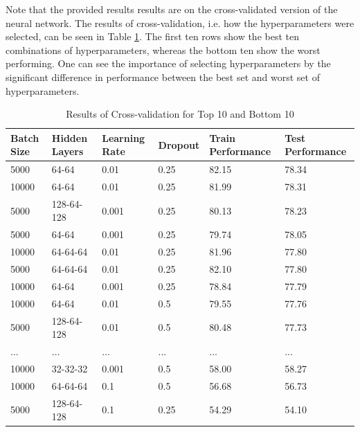 Note that the provided results results are on the cross-validated version of the neural network. The results of cross-validation, i.e. how the hyperparameters were selected, can be seen in Table \ref{tab:crossval}. The first ten rows show the best ten combinations of hyperparameters, whereas the bottom ten show the worst performing. One can see the importance of selecting hyperparameters by the significant difference in performance between the best set and worst set of hyperparameters.\\
\begin{table}[]
\centering
\caption{Results of Cross-validation for Top 10 and Bottom 10}
\label{tab:crossval}
\begin{tabular}{llllll}
\textbf{Batch Size} & \textbf{Hidden Layers} & \textbf{Learning Rate} & \textbf{Dropout} & \textbf{Train Performance} & \textbf{Test Performance} \\ \hline
5000       & 64-64         & 0.01          & 0.25    & 82.15            & 78.34           \\
10000      & 64-64         & 0.01          & 0.25    & 81.99            & 78.31           \\
5000       & 128-64-128    & 0.001         & 0.25    & 80.13            & 78.23           \\
5000       & 64-64         & 0.001         & 0.25    & 79.74            & 78.05           \\
10000      & 64-64-64      & 0.01          & 0.25    & 81.96            & 77.80           \\
5000       & 64-64-64      & 0.01          & 0.25    & 82.10            & 77.80           \\
10000      & 64-64         & 0.001         & 0.25    & 78.84            & 77.79           \\
10000      & 64-64         & 0.01          & 0.5     & 79.55            & 77.76           \\
5000       & 128-64-128    & 0.01          & 0.5     & 80.48            & 77.73           \\
...        & ...           & ...           & ...     & ...              & ...             \\
10000      & 32-32-32      & 0.001         & 0.5     & 58.00            & 58.27           \\
10000      & 64-64-64      & 0.1           & 0.5     & 56.68            & 56.73           \\
5000       & 128-64-128    & 0.1           & 0.25    & 54.29            & 54.10           \\

\end{tabular}
\end{table}
